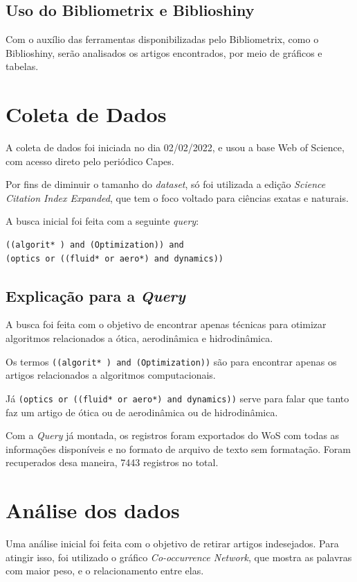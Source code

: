     
    
\subsection{Uso do Bibliometrix e Biblioshiny}
     Com o auxílio das ferramentas disponibilizadas pelo Bibliometrix, como o Biblioshiny, serão analisados os artigos encontrados, por meio de gráficos e tabelas.   
\section{Coleta de Dados}
    A coleta de dados foi iniciada no dia 02/02/2022, e usou a base Web of Science, com acesso direto pelo periódico Capes.
    
    Por fins de diminuir o tamanho do \emph{dataset}, só foi utilizada a edição \emph{Science Citation Index Expanded}, que tem o foco voltado para ciências exatas e naturais.
    
    A busca inicial foi feita com a seguinte \emph{query}:
\begin{lstlisting}[basicstyle = \normalsize]
((algorit* ) and (Optimization)) and 
(optics or ((fluid* or aero*) and dynamics))
\end{lstlisting}
\subsection{Explicação para a \emph{Query}}
    A busca foi feita com o objetivo de encontrar apenas técnicas para otimizar algoritmos relacionados a ótica, aerodinâmica e hidrodinâmica.
    
    Os termos \verb|((algorit* ) and (Optimization))| são para encontrar apenas os artigos relacionados a algoritmos computacionais.
    
    Já \verb|(optics or ((fluid* or aero*) and dynamics))| serve para falar que tanto faz um artigo de ótica ou de aerodinâmica ou de hidrodinâmica.
    
    Com a \emph{Query} já montada, os registros foram exportados do WoS com todas as informações disponíveis e no formato de arquivo de texto sem formatação. Foram recuperados desa maneira, 7443 registros no total.
\section{Análise dos dados}
    Uma análise inicial foi feita com o objetivo de retirar artigos indesejados. Para atingir isso, foi utilizado o gráfico \emph{Co-occurrence Network}, que mostra as palavras com maior peso, e o relacionamento entre elas.
    
